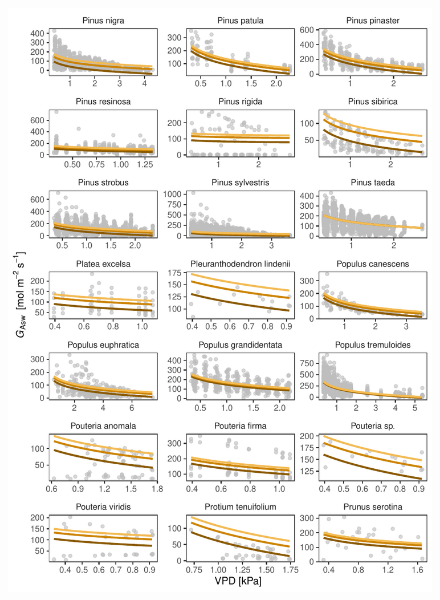 \documentclass[11pt,twoside]{reedthesis}
\begin{document}
\begin{figure}[H]

{\centering \includegraphics[width=1\linewidth]{figure/appendixD/ggg5} 

}

\end{figure}
\end{document}
